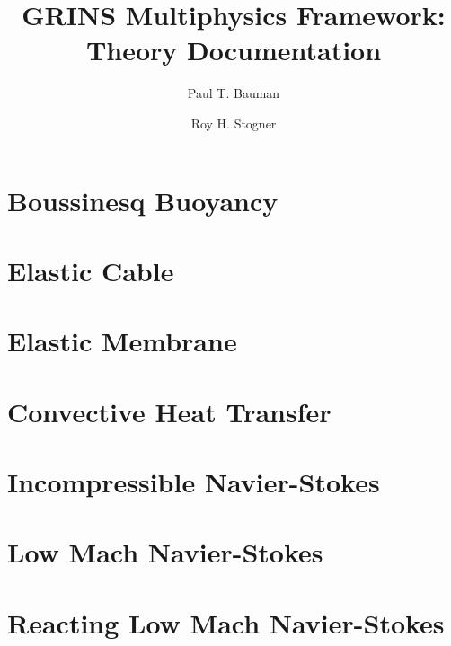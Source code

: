\documentclass[twoside]{report}
\begin{document}
\author{Paul T. Bauman \and Roy H. Stogner}
\title{GRINS Multiphysics Framework:\\
Theory Documentation}
\maketitle
\tableofcontents

\chapter{Boussinesq Buoyancy}

\chapter{Elastic Cable}

\chapter{Elastic Membrane}

\chapter{Convective Heat Transfer}

\chapter{Incompressible Navier-Stokes}

\chapter{Low Mach Navier-Stokes}

\chapter{Reacting Low Mach Navier-Stokes}



\end{document}
